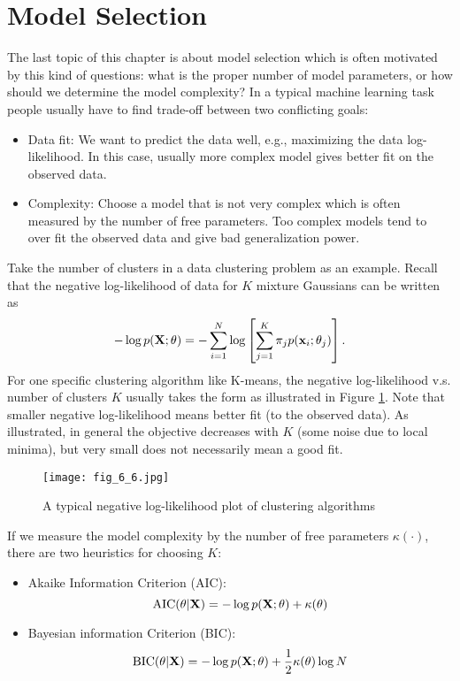 \documentclass[../main.tex]{subfiles}
\begin{document}
\section{Model Selection}
The last topic of this chapter is about model selection which is often motivated by this kind of questions: what is the proper number of model parameters, or how should we determine the model complexity? In a typical machine learning task people usually have to find trade-off between two conflicting goals:
\begin{itemize}
	\item Data fit: We want to predict the data well, e.g., maximizing the data log-likelihood. In this case, usually more complex model gives better fit on the observed data.
	\item Complexity: Choose a model that is not very complex which is often measured by the number of free parameters. Too complex models tend to over fit the observed data and give bad generalization power.
\end{itemize}
Take the number of clusters in a data clustering problem as an example. Recall that the negative log-likelihood of data for $K$ mixture Gaussians can be written as
\begin{equation*}
-\log p({\bf X};\theta)=-\sum_{i=1}^{N}\log \left[\sum_{j=1}^{K}\pi_jp({\bf x}_i;\theta_j)\right].
\end{equation*}
For one specific clustering algorithm like K-means, the negative log-likelihood v.s. number of clusters $K$ usually takes the form as illustrated in Figure \ref{fig_6_6}. Note that smaller negative log-likelihood means better fit (to the observed data). As illustrated, in general the objective decreases with $K$ (some noise due to local minima), but very small does not necessarily mean a good fit. 
\begin{figure}[h] 
	\centering 
	\texttt{[image: fig\_6\_6.jpg]} 
	\caption{A typical negative log-likelihood plot of clustering algorithms}\label{fig_6_6}
\end{figure}
\par If we measure the model complexity by the number of free parameters $\kappa(\cdot)$, there are two heuristics for choosing $K$:
\begin{itemize}
	\item Akaike Information Criterion (AIC):
	\begin{equation*}
	{\rm AIC}(\theta|{\bf X})=-\log p({\bf X};\theta)+\kappa(\theta)
	\end{equation*}
	\item Bayesian information Criterion (BIC):
	\begin{equation*}
	{\rm BIC}(\theta|{\bf X})=-\log p({\bf X};\theta)+\frac{1}{2}\kappa(\theta)\log N
	\end{equation*}
\end{itemize}
\end{document}
